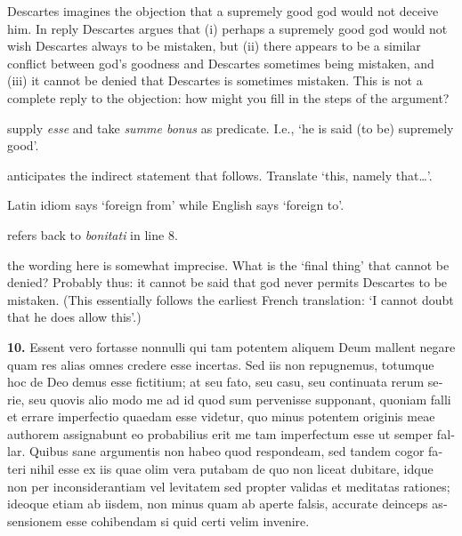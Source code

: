  Descartes imagines the objection that a supremely good god would not deceive him. In reply Descartes argues that (i) perhaps a supremely good god would not wish Descartes always to be mistaken, but (ii) there appears to be a similar conflict between god's goodness and Descartes sometimes being mistaken, and (iii) it cannot be denied that Descartes is sometimes mistaken. This is not a complete reply to the objection: how might you fill in the steps of the argument?

 supply \textit{esse} and take \textit{summe bonus} as predicate. I.e., `he is said (to be) supremely good'.

 anticipates the indirect statement that follows. Translate `this, namely that\dots'.

 Latin idiom says `foreign from' while English says `foreign to'.

 refers back to \textit{bonitati} in line 8.

 the wording here is somewhat imprecise. What is the `final thing' that cannot be denied? Probably thus: it cannot be said that god never permits Descartes to be mistaken. (This essentially follows the earliest French translation: `I cannot doubt that he does allow this'.)

\clearpage

\beginnumbering
\pstart
\begin{latin}
    \textenglish{\textbf{10.}} Essent vero fortasse nonnulli qui tam potentem aliquem Deum mallent negare quam res alias omnes credere esse incertas. Sed iis non repugnemus, totumque hoc de Deo demus esse fictitium; at seu fato, seu casu, seu continuata rerum serie, seu quovis alio modo me ad id quod sum pervenisse supponant, quoniam falli et errare imperfectio quaedam esse videtur, quo minus potentem originis meae authorem assignabunt eo probabilius erit me tam imperfectum esse ut semper fallar. Quibus sane argumentis non habeo quod respondeam, sed tandem cogor fateri nihil esse ex iis quae olim vera putabam de quo non liceat dubitare, idque non per inconsiderantiam vel levitatem sed propter validas et meditatas rationes; ideoque etiam ab iisdem, non minus quam ab aperte falsis, accurate deinceps assensionem esse cohibendam si quid certi velim invenire.
\end{latin}
\pend
\endnumbering

\prenotes

